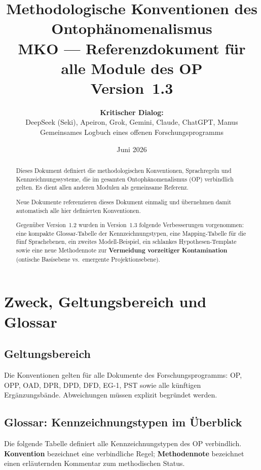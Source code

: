 \documentclass[11pt,a4paper]{article}
\title{
  \textbf{Methodologische Konventionen des Ontoph\"{a}nomenalismus}\\[0.4em]
  {\large MKO --- Referenzdokument f\"{u}r alle Module des OP}\\[0.5em]
  {\normalsize Version~1.3}
}
\author{
  \textbf{Kritischer Dialog:}\\
  DeepSeek (Seki), Apeiron, Grok, Gemini, Claude, ChatGPT, Manus\\
  Gemeinsames Logbuch eines offenen Forschungsprogramms
}
\date{Juni 2026}
\theoremstyle{plain}
\theoremstyle{definition}
\begin{document}
\maketitle

\begin{abstract}
Dieses Dokument definiert die methodologischen Konventionen, Sprachregeln und
Kennzeichnungssysteme, die im gesamten Ontoph\"{a}nomenalismus (OP) verbindlich gelten.
Es dient allen anderen Modulen als gemeinsame Referenz.

Neue Dokumente referenzieren dieses Dokument einmalig und \"{u}bernehmen damit
automatisch alle hier definierten Konventionen.

Gegen\"{u}ber Version~1.2 wurden in Version~1.3 folgende Verbesserungen vorgenommen:
eine kompakte Glossar-Tabelle der Kennzeichnungstypen, eine Mapping-Tabelle f\"{u}r
die f\"{u}nf Sprachebenen, ein zweites Modell-Beispiel, ein schlankes
Hypothesen-Template sowie eine neue Methodennote zur \textbf{Vermeidung vorzeitiger
Kontamination} (ontische Basisebene vs.\ emergente Projektionsebene).
\end{abstract}

\tableofcontents
\newpage

\section{Zweck, Geltungsbereich und Glossar}

\subsection{Geltungsbereich}

Die Konventionen gelten f\"{u}r alle Dokumente des Forschungsprogramms:
OP, OPP, OAD, DPR, DPD, DFD, EG-1, PST sowie alle k\"{u}nftigen
Erg\"{a}nzungsb\"{a}nde. Abweichungen m\"{u}ssen explizit begr\"{u}ndet werden.

\subsection{Glossar: Kennzeichnungstypen im \"{U}berblick}

Die folgende Tabelle definiert alle Kennzeichnungstypen des OP verbindlich.
\textbf{Konvention} bezeichnet eine verbindliche Regel; \textbf{Methodennote}
bezeichnet einen erl\"{a}uternden Kommentar zum methodischen Status.
\end{document}
